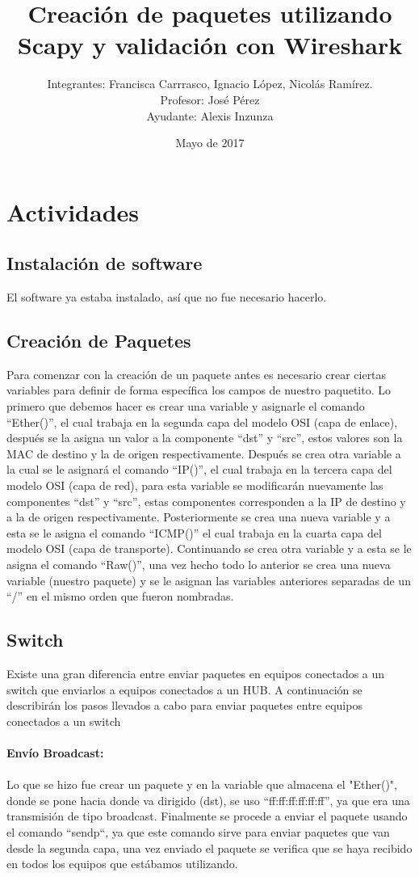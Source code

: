 \documentclass{udpreport}
\title{Creación de paquetes utilizando Scapy y validación con
Wireshark}
\author{Integrantes: Francisca Carrrasco, Ignacio López, Nicolás Ramírez.\\Profesor: José Pérez
\\Ayudante: Alexis Inzunza}
\date{Mayo de 2017}
\begin{document}
\maketitle
\tableofcontents
\listoffigures
\chapter{Actividades}
	\section{Instalación de software}
    	El software ya estaba instalado, así que no fue necesario hacerlo. \\
	\section{Creación de Paquetes}
		Para comenzar con la creación de un paquete antes es necesario crear ciertas variables para definir de forma específica los campos de nuestro paquetito. Lo primero que debemos hacer es crear una variable y asignarle el comando “Ether()”, el cual trabaja en la segunda capa del modelo OSI (capa de enlace), después se la asigna un valor a la componente “dst” y “src”, estos valores son la MAC
		de destino y la de origen respectivamente.
		Después se crea otra variable a la cual se le asignará el comando “IP()”, el cual trabaja en la tercera
		capa del modelo OSI (capa de red), para esta variable se modificarán nuevamente las componentes “dst” y “src”, estas componentes corresponden a la IP de destino y a la de origen respectivamente.
		Posteriormente se crea una nueva variable y a esta se le asigna el
		comando “ICMP()” el cual trabaja en la cuarta capa del modelo OSI (capa de transporte). Continuando se crea otra variable y a esta se le asigna el comando “Raw()”, una vez hecho todo lo anterior se crea una nueva variable (nuestro paquete)  y se le asignan las variables anteriores separadas de un “/” en el mismo orden que fueron nombradas.
	
	\section{Switch}
		Existe una gran diferencia entre enviar paquetes en equipos conectados a un switch que enviarlos a equipos conectados a un HUB. A continuación se describirán los pasos llevados a cabo para enviar paquetes entre equipos conectados a un switch\\\\
		{\bf \large Envío Broadcast:}\\\\
		Lo que se hizo fue crear un paquete y en la variable que almacena el "Ether()", donde se pone hacia donde
		va dirigido (dst), se uso “ff:ff:ff:ff:ff:ff”, ya que era una transmisión de tipo broadcast.
		Finalmente se procede a enviar el paquete usando el comando “sendp“, ya que este comando sirve para enviar paquetes que van desde la segunda capa, una vez enviado el paquete se verifica que se haya recibido en todos los equipos que estábamos utilizando.\\\\
		
\end{document}
